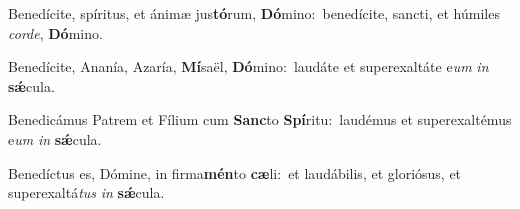 Benedícite, spíritus, et ánimæ jus\textbf{tó}rum, \textbf{Dó}mino:~\redgreheightstar benedícite, sancti, et húmiles \textit{cor}\textit{de}, \textbf{Dó}mino.

Benedícite, Ananía, Azaría, \textbf{Mí}saël, \textbf{Dó}mino:~\redgreheightstar laudáte et superexaltáte e\textit{um} \textit{in} \textbf{sǽ}cula.

Benedicámus Patrem et Fílium cum \textbf{Sanc}to \textbf{Spí}ritu:~\redgreheightstar laudémus et superexaltémus e\textit{um} \textit{in} \textbf{sǽ}cula.

Benedíctus es, Dómine, in firma\textbf{mén}to \textbf{cæ}li:~\redgreheightstar et laudábilis, et gloriósus, et superexaltá\textit{tus} \textit{in} \textbf{sǽ}cula.

